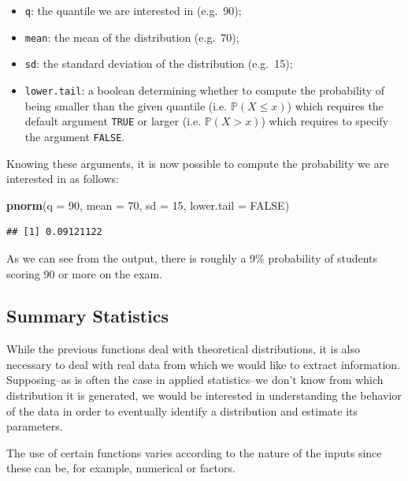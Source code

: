 \documentclass[]{book}
\newenvironment{Shaded}{\begin{snugshade}}{\end{snugshade}}
\newcommand{\KeywordTok}[1]{\textcolor[rgb]{0.13,0.29,0.53}{\textbf{{#1}}}}
\newcommand{\DataTypeTok}[1]{\textcolor[rgb]{0.13,0.29,0.53}{{#1}}}
\newcommand{\DecValTok}[1]{\textcolor[rgb]{0.00,0.00,0.81}{{#1}}}
\newcommand{\OtherTok}[1]{\textcolor[rgb]{0.56,0.35,0.01}{{#1}}}
\newcommand{\NormalTok}[1]{{#1}}
\providecommand{\tightlist}{%
  \setlength{\itemsep}{0pt}\setlength{\parskip}{0pt}}
\theoremstyle{definition}
\theoremstyle{definition}
\theoremstyle{remark}
\begin{document}
\begin{itemize}
\tightlist
\item
  \texttt{q}: the quantile we are interested in (e.g.~90);
\item
  \texttt{mean}: the mean of the distribution (e.g.~70);
\item
  \texttt{sd}: the standard deviation of the distribution (e.g.~15);
\item
  \texttt{lower.tail}: a boolean determining whether to compute the
  probability of being smaller than the given quantile (i.e.
  \(\mathbb{P}(X \leq x)\)) which requires the default argument
  \texttt{TRUE} or larger (i.e. \(\mathbb{P}(X > x)\)) which requires to
  specify the argument \texttt{FALSE}.
\end{itemize}

Knowing these arguments, it is now possible to compute the probability
we are interested in as follows:

\begin{Shaded}
\begin{Highlighting}[]
\KeywordTok{pnorm}\NormalTok{(}\DataTypeTok{q =} \DecValTok{90}\NormalTok{, }\DataTypeTok{mean =} \DecValTok{70}\NormalTok{, }\DataTypeTok{sd =} \DecValTok{15}\NormalTok{, }\DataTypeTok{lower.tail =} \OtherTok{FALSE}\NormalTok{) }
\end{Highlighting}
\end{Shaded}

\begin{verbatim}
## [1] 0.09121122
\end{verbatim}

As we can see from the output, there is roughly a 9\% probability of
students scoring 90 or more on the exam.

\subsection{Summary Statistics}\label{summary-statistics}

While the previous functions deal with theoretical distributions, it is
also necessary to deal with real data from which we would like to
extract information. Supposing--as is often the case in applied
statistics--we don't know from which distribution it is generated, we
would be interested in understanding the behavior of the data in order
to eventually identify a distribution and estimate its parameters.

The use of certain functions varies according to the nature of the
inputs since these can be, for example, numerical or factors.
\end{document}
